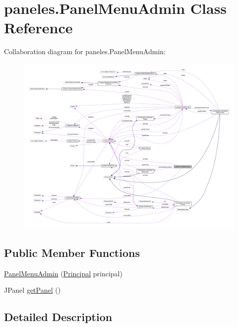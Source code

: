 \hypertarget{classpaneles_1_1_panel_menu_admin}{}\section{paneles.\+Panel\+Menu\+Admin Class Reference}
\label{classpaneles_1_1_panel_menu_admin}


Collaboration diagram for paneles.\+Panel\+Menu\+Admin\+:
\nopagebreak
\begin{figure}[H]
\begin{center}
\leavevmode
\includegraphics[width=350pt]{classpaneles_1_1_panel_menu_admin__coll__graph}
\end{center}
\end{figure}
\subsection*{Public Member Functions}
\begin{DoxyCompactItemize}
\item 
\mbox{\hyperlink{classpaneles_1_1_panel_menu_admin_ae686f35c694b90e334b64c385aa959ee}{Panel\+Menu\+Admin}} (\mbox{\hyperlink{classvistas_1_1_principal}{Principal}} principal)
\item 
J\+Panel \mbox{\hyperlink{classpaneles_1_1_panel_menu_admin_a45a3165ede4cd4e1d926a7d07cedc8a1}{get\+Panel}} ()
\end{DoxyCompactItemize}


\subsection{Detailed Description}


